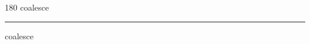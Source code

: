 
\begin{frame}
\begin{center}
\begin{turn}{180}
{\fontsize{2.5cm}{1em}\selectfont coalesce}
\end{turn}
\vspace{1em}\par  
\hrule
\vspace{1em}\par  
{\fontsize{2.5cm}{1em}\selectfont coalesce}
\end{center}
\end{frame}
